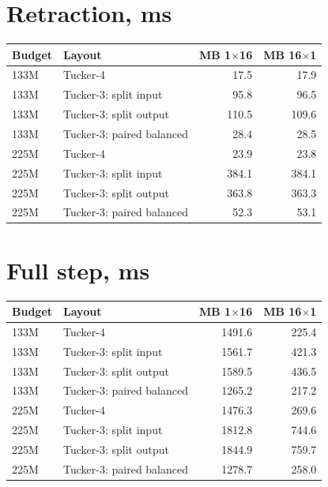 \documentclass[10pt]{article}
\begin{document}
\section{Retraction, ms}
\begin{center}
\small
\begin{tabular}{llrr}
\toprule
\textbf{Budget} & \textbf{Layout} & \textbf{MB 1$\times$16} & \textbf{MB 16$\times$1} \\
\midrule
133M & Tucker-4 & 17.5 & 17.9 \\
133M & Tucker-3: split input & 95.8 & 96.5 \\
133M & Tucker-3: split output & 110.5 & 109.6 \\
133M & Tucker-3: paired balanced & 28.4 & 28.5 \\
225M & Tucker-4 & 23.9 & 23.8 \\
225M & Tucker-3: split input & 384.1 & 384.1 \\
225M & Tucker-3: split output & 363.8 & 363.3 \\
225M & Tucker-3: paired balanced & 52.3 & 53.1 \\
\bottomrule
\end{tabular}
\end{center}
\section{Full step, ms}
\begin{center}
\small
\begin{tabular}{llrr}
\toprule
\textbf{Budget} & \textbf{Layout} & \textbf{MB 1$\times$16} & \textbf{MB 16$\times$1} \\
\midrule
133M & Tucker-4 & 1491.6 & 225.4 \\
133M & Tucker-3: split input & 1561.7 & 421.3 \\
133M & Tucker-3: split output & 1589.5 & 436.5 \\
133M & Tucker-3: paired balanced & 1265.2 & 217.2 \\
225M & Tucker-4 & 1476.3 & 269.6 \\
225M & Tucker-3: split input & 1812.8 & 744.6 \\
225M & Tucker-3: split output & 1844.9 & 759.7 \\
225M & Tucker-3: paired balanced & 1278.7 & 258.0 \\
\bottomrule
\end{tabular}
\end{center}
\end{document}
